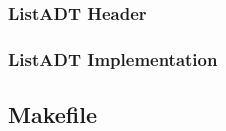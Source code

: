 \documentclass[10pt,letterpaper]{article}
\begin{document}
\noindent\hrulefill

\subsubsection*{ListADT Header}



\noindent\hrulefill

\subsubsection*{ListADT Implementation}



\noindent\hrulefill

\subsection*{Makefile}


\end{document}

